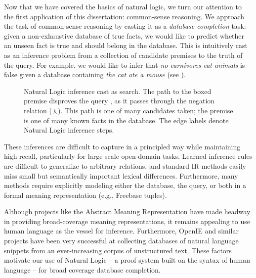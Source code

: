 Now that we have covered the basics of natural logic, we turn our
  attention to the first application of this dissertation: common-sense
  reasoning.
We approach the task of common-sense reasoning by casting it
  as a \textit{database completion} task: given a non-exhaustive
  database of true facts, we would like to predict whether an unseen fact
  is true and should belong in the database.
This is intuitively cast as an inference problem from 
  a collection of candidate premises to the truth of the query.
For example, we would like to infer 
  that \textit{no carnivores eat animals}
  is false given a database containing \textit{the cat ate a mouse}
  (see ).

\begin{figure}[th]
\begin{center}
  \teaserSearch
\end{center}
{
  Natural Logic inference cast as search. The path to
    the boxed premise  disproves the
    query , as it passes through
    the negation relation ($\curlywedge$).
  This path is one of many candidates taken; the premise
    is one of many known facts in the database.
  The edge labels denote Natural Logic inference steps.
  \label{fig:naturalli-teaser}
}
\end{figure}

These inferences are difficult to capture in a principled way
  while maintaining high recall, particularly for 
  large scale open-domain tasks.
Learned inference rules are difficult to generalize to arbitrary
  relations, and standard IR methods easily miss small but
  semantically important lexical differences.
Furthermore, many methods require explicitly modeling either the
  database, the query, or both in a formal meaning representation
  (e.g., Freebase tuples).

Although projects like the Abstract Meaning Representation
  \cite{key:2013banarescu-amr} have made headway in providing
  broad-coverage meaning representations, it remains 
  appealing to use human language as the vessel for
  inference.
Furthermore, OpenIE and similar projects have been very successful at
  collecting databases of natural language snippets
  from an ever-increasing corpus of unstructured text.
These factors motivate our use of Natural Logic -- a proof system built
  on the syntax of human language -- for
  broad coverage database completion.

